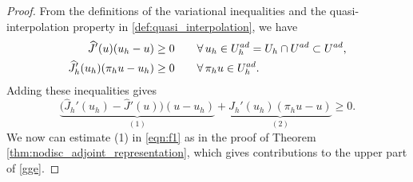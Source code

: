 \documentclass[10pt,a4paper]{amsart}
\newcommand{\Uadh}{{U^{\textup{ad}}_h}}
\newcommand{\Uad}{{U^{\textup{ad}}}}
\newcommand{\bp}{{\mathbf{p}}}
\newcommand{\bq}{{\mathbf{q}}}
\begin{document}
\begin{proof}
From the definitions of the variational inequalities and the quasi-interpolation property in \eqref{def:quasi_interpolation}, we have 
\begin{align*}
 \widehat J'(u)(u_h - u) &\ge 0 \qquad \forall\, u_h \in \Uadh = U_h \cap \Uad \subset \Uad, \\
 \widehat J_h'(u_h)(\pi_h u - u_h) &\ge 0 \qquad \forall\, \pi_h u \in \Uadh.
\end{align*}
Adding these inequalities gives
\begin{equation}\label{eqn:f1}
   \underbrace{\big(\widehat J_h'(u_h) - \widehat J'(u)\big)(u - u_h)}_{(1)} + \underbrace{\widehat J_h'(u_h)(\pi_h u - u)}_{(2)} \ge 0.
\end{equation}
We now can estimate (1) in \eqref{eqn:f1} as in the proof of Theorem \ref{thm:nodisc_adjoint_representation}, which gives contributions to the upper part of \eqref{gge}. %

\end{proof}
\end{document}
